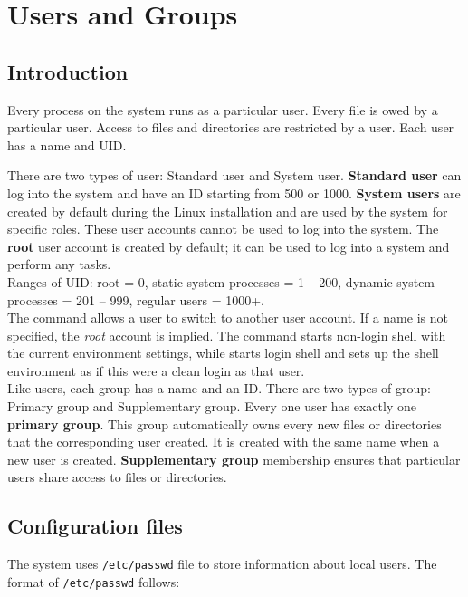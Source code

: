 \chapter{Users and Groups}

\section{Introduction}

Every process on the system runs as a particular user. Every file is owed by a particular user. Access to files and directories are restricted by a user. Each user has a name and UID. 

There are two types of user: Standard user and System user. \textbf{Standard user} can log into the system and have an ID starting from 500 or 1000. \textbf{System users} are created by default during the Linux installation and are used by the system for specific roles. These user accounts cannot be used to log into the system. The \textbf{root} user account is created by default; it can be used to log into a system and perform any tasks.\\

Ranges of UID: root = 0, static system processes = 1 -- 200, dynamic system processes = 201 -- 999, regular users = 1000+.\\

The  command allows a user to switch to another user account. If a name is not specified, the \emph{root} account is implied. The command  starts non-login shell with the current environment settings, while  starts login shell and sets up the shell environment as if this were a clean login as that user.\\

Like users, each group has a name and an ID. There are two types of group: Primary group and Supplementary group. Every one user has exactly one \textbf{primary group}. This group automatically owns every new files or directories that the corresponding user created. It is  created with the same name when a new user is created. \textbf{Supplementary group} membership ensures that particular users share access to files or directories. 

\section{Configuration files}

The system uses \verb|/etc/passwd| file to store information about local users. The format of \verb|/etc/passwd| follows: 

